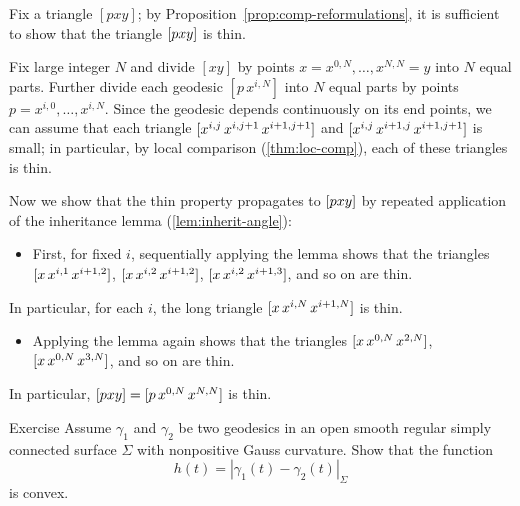Fix a triangle $[p x y]$; 
by Proposition~\ref{prop:comp-reformulations}, it is sufficient to show that the triangle $[p{x}{y}]$ is thin.   

Fix large integer $N$ and 
divide $[xy]$ by points $x=x^{0,N},\dots,x^{N,N}=y$ into $N$ equal parts.
Further divide each geodesic $[p\,x^{i,N}]$ into $N$ equal parts by points $p=x^{i,0},\dots,x^{i,N}$.
Since the geodesic depends continuously on its end points, we can assume that each triangle 
 $[x^{i,j}{\,x^{i,j+1}}{\,x^{i+1,j+1}}]$ and $[x^{i,j}{\,x^{i+1,j}}{\,x^{i+1,j+1}}]$ is small;
 in particular, by local comparison (\ref{thm:loc-comp}), each of these triangles is thin. 

Now we show that the thin property propagates to $[p{x}{y}]$ by repeated application of the inheritance lemma (\ref{lem:inherit-angle}):
\begin{itemize}
\item 
First, for fixed $i$, 
sequentially applying the lemma shows  that the triangles 
$[x{\,x^{i,1}}{\,x^{i+1,2}}]$, 
$[x{\,x^{i,2}}{\,x^{i+1,2}}]$, 
$[x{\,x^{i,2}}{\,x^{i+1,3}}]$,
and so on are thin. 
\end{itemize}
In particular, for each $i$, the long triangle $[x{\,x^{i,N}}{\,x^{i+1,N}}]$ is thin.
\begin{itemize} 
\item 
Applying the lemma again shows that the  triangles $[x{\,x^{0,N}}{\,x^{2,N}}]$, $[x{\,x^{0,N}}{\,x^{3,N}}]$, and so on are thin. 
\end{itemize}
In particular, $[p{x}{y}]=[p{\,x^{0,N}}{\,x^{N,N}}]$ is thin.
\qeds


\begin{thm}{Exercise}
Assume $\gamma_1$ and $\gamma_2$ be two geodesics in an open smooth regular simply connected surface $\Sigma$ with nonpositive Gauss curvature.
Show that the function
\[h(t)=|\gamma_1(t)-\gamma_2(t)|_\Sigma\]
is convex.
\end{thm}
